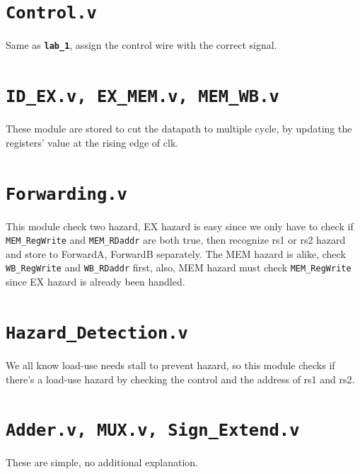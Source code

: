 \documentclass[12pt]{article}
\begin{document}
\section* {\texttt{Control.v}}
Same as \textbf{\texttt{lab\_1}}, assign the control wire with the correct signal.

\section* {\texttt{ID\_EX.v, EX\_MEM.v, MEM\_WB.v}}
These module are stored to cut the datapath to multiple cycle, by updating the registers' value at the rising edge of clk.

\section* {\texttt{Forwarding.v}}
This module check two hazard, EX hazard is easy since we only have to check if \texttt{MEM\_RegWrite} and \texttt{MEM\_RDaddr} are both true, then recognize rs1 or rs2 hazard and store to ForwardA, ForwardB separately. The MEM hazard is alike, check \texttt{WB\_RegWrite} and \texttt{WB\_RDaddr} first, also, MEM hazard must check \texttt{MEM\_RegWrite} since EX hazard is already been handled.

\section* {\texttt{Hazard\_Detection.v}}
We all know load-use needs stall to prevent hazard, so this module checks if there's a load-use hazard by checking the control and the address of rs1 and rs2.

\section* {\texttt{Adder.v, MUX.v, Sign\_Extend.v}}
These are simple, no additional explanation.
\end{document}
